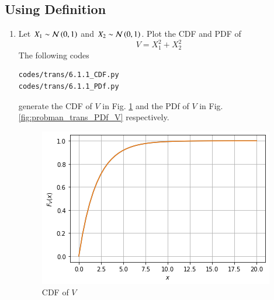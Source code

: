 \renewcommand{\theequation}{\theenumi}
\renewcommand{\thefigure}{\theenumi}

\subsection{Using Definition}
\begin{enumerate}[label=\thesubsection.\arabic*.,ref=\thesubsection.\theenumi]

%
\item
Let $X_1 \sim  \mathcal{N}\left(0,1\right)$ and $X_2 \sim  \mathcal{N}\left(0,1\right)$. Plot the CDF and PDF of
%
\begin{equation}
V = X_1^2 + X_2^2 
\end{equation}
%
\solution The following codes
\begin{lstlisting}
codes/trans/6.1.1_CDF.py
codes/trans/6.1.1_PDf.py
\end{lstlisting}
generate the CDF of $V$  in Fig. \ref{fig:probman_trans_cdf_V} and the PDf of $V$ in Fig. \ref{fig:probman_trans_PDf_V} respectively.
\begin{figure}[!ht]
\centering
\includegraphics[width=\columnwidth]{./figs/trans/6.1.1.cdf.png}
\caption{CDF of $V$}
\label{fig:probman_trans_cdf_V}
\end{figure}


\end{enumerate}
